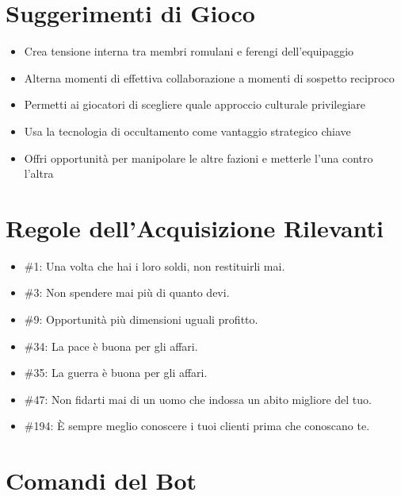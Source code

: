 \documentclass[11pt,a4paper]{article}
\begin{document}
\section{Suggerimenti di Gioco}

\begin{tcolorbox}[colback=romlightgreen!10, colframe=romgreen]
\begin{itemize}[leftmargin=*]
\item Crea tensione interna tra membri romulani e ferengi dell'equipaggio
\item Alterna momenti di effettiva collaborazione a momenti di sospetto reciproco
\item Permetti ai giocatori di scegliere quale approccio culturale privilegiare
\item Usa la tecnologia di occultamento come vantaggio strategico chiave
\item Offri opportunità per manipolare le altre fazioni e metterle l'una contro l'altra
\end{itemize}
\end{tcolorbox}

\section{Regole dell'Acquisizione Rilevanti}

\begin{tcolorbox}[colback=ferengigold!20, colframe=ferengigold]
\begin{itemize}[leftmargin=*]
\item \#1: Una volta che hai i loro soldi, non restituirli mai.
\item \#3: Non spendere mai più di quanto devi.
\item \#9: Opportunità più dimensioni uguali profitto.
\item \#34: La pace è buona per gli affari.
\item \#35: La guerra è buona per gli affari.
\item \#47: Non fidarti mai di un uomo che indossa un abito migliore del tuo.
\item \#194: È sempre meglio conoscere i tuoi clienti prima che conoscano te.
\end{itemize}
\end{tcolorbox}

\section{Comandi del Bot}
\end{document}
